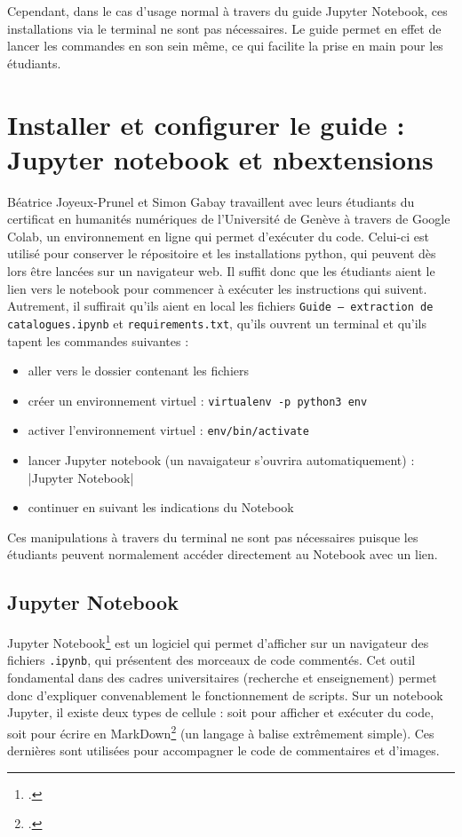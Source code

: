 \documentclass[a4paper,12pt,twoside]{book}
\begin{document}
Cependant, dans le cas d'usage normal à travers du guide Jupyter Notebook, ces installations via le terminal ne sont pas nécessaires. Le guide permet en effet de lancer les commandes en son sein même, ce qui facilite la prise en main pour les étudiants. 


\section{Installer et configurer le guide : Jupyter notebook et nbextensions}


Béatrice Joyeux-Prunel et Simon Gabay travaillent avec leurs étudiants du certificat en humanités numériques de l'Université de Genève à travers de Google Colab, un environnement en ligne qui permet d'exécuter du code. Celui-ci est utilisé pour conserver le répositoire et les installations python, qui peuvent dès lors être lancées sur un navigateur web. Il suffit donc que les étudiants aient le lien vers le notebook pour commencer à exécuter les instructions qui suivent. Autrement, il suffirait qu'ils aient en local les fichiers \texttt{Guide – extraction de catalogues.ipynb} et \texttt{requirements.txt}, qu'ils ouvrent un terminal et qu'ils tapent les commandes suivantes : 
	\begin{itemize}
		\item aller vers le dossier contenant les fichiers
		\item créer un environnement virtuel : \texttt{virtualenv -p python3 env}
		\item activer l'environnement virtuel : \texttt{env/bin/activate}
		\item lancer Jupyter notebook (un navaigateur s'ouvrira automatiquement) : 
		|Jupyter Notebook|
		\item continuer en suivant les indications du Notebook
	\end{itemize}

Ces manipulations à travers du terminal ne sont pas nécessaires puisque les étudiants peuvent normalement accéder directement au Notebook avec un lien.\\

\subsection{Jupyter Notebook}

Jupyter Notebook\footcite{JupyterNotebook} est un logiciel qui permet d'afficher sur un navigateur des fichiers \texttt{.ipynb}, qui présentent des morceaux de code commentés. Cet outil fondamental dans des cadres universitaires (recherche et enseignement) permet donc d'expliquer convenablement le fonctionnement de scripts. Sur un notebook Jupyter, il existe deux types de cellule : soit pour afficher et exécuter du code, soit pour écrire en MarkDown\footcite{MarkdownguideOrg} (un langage à balise extrêmement simple). Ces dernières sont utilisées pour accompagner le code de commentaires et d'images.
\end{document}

